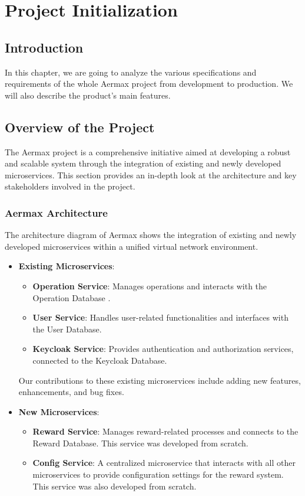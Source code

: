 \chapter{Project Initialization}


\setcounter{secnumdepth}{0} %


\section{Introduction}
In this chapter, we are going to analyze the various specifications and requirements of the whole Aermax project from development to production.
We will also describe the product's main features.
\setcounter{secnumdepth}{0}
\section{Overview of the Project}
The Aermax project is a comprehensive initiative aimed at developing a robust and scalable system through the integration of existing and newly developed microservices. This section provides an in-depth look at the architecture and key stakeholders involved in the project.

\subsection{Aermax Architecture}

The architecture diagram of Aermax shows the integration of existing and newly developed microservices within a unified virtual network environment.
\begin{itemize}
    \item \textbf{Existing Microservices}:
    \begin{itemize}
        \item \textbf{Operation Service}: Manages operations and interacts with the Operation Database .
        \item \textbf{User Service}: Handles user-related functionalities and interfaces with the User Database.
        \item \textbf{Keycloak Service}: Provides authentication and authorization services, connected to the Keycloak Database.
    \end{itemize}
    Our contributions to these existing microservices include adding new features, enhancements, and bug fixes.
    \item \textbf{New Microservices}:
    \begin{itemize}
        \item \textbf{Reward Service}: Manages reward-related processes and connects to the Reward Database. This service was developed from scratch.
        \item \textbf{Config Service}: A centralized microservice that interacts with all other microservices to provide configuration settings for the reward system. This service was also developed from scratch.
    \end{itemize}
\end{itemize}

